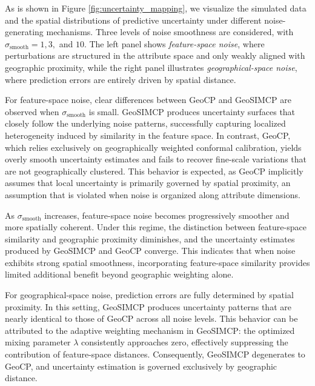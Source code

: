 \documentclass[authoryear,preprint,review,12pt]{elsarticle}
\begin{document}
{
\color{red}
As is shown in Figure \ref{fig:uncertainty_mapping}, we visualize the simulated data and the spatial distributions of predictive uncertainty under different noise-generating mechanisms. Three levels of noise smoothness are considered, with $\sigma_{\text{smooth}} = 1, 3,$ and $10$. The left panel shows \emph{feature-space noise}, where perturbations are structured in the attribute space and only weakly aligned with geographic proximity, while the right panel illustrates \emph{geographical-space noise}, where prediction errors are entirely driven by spatial distance.

For feature-space noise, clear differences between GeoCP and GeoSIMCP are observed when $\sigma_{\text{smooth}}$ is small. GeoSIMCP produces uncertainty surfaces that closely follow the underlying noise patterns, successfully capturing localized heterogeneity induced by similarity in the feature space. In contrast, GeoCP, which relies exclusively on geographically weighted conformal calibration, yields overly smooth uncertainty estimates and fails to recover fine-scale variations that are not geographically clustered. This behavior is expected, as GeoCP implicitly assumes that local uncertainty is primarily governed by spatial proximity, an assumption that is violated when noise is organized along attribute dimensions.

As $\sigma_{\text{smooth}}$ increases, feature-space noise becomes progressively smoother and more spatially coherent. Under this regime, the distinction between feature-space similarity and geographic proximity diminishes, and the uncertainty estimates produced by GeoSIMCP and GeoCP converge. This indicates that when noise exhibits strong spatial smoothness, incorporating feature-space similarity provides limited additional benefit beyond geographic weighting alone.

For geographical-space noise, prediction errors are fully determined by spatial proximity. In this setting, GeoSIMCP produces uncertainty patterns that are nearly identical to those of GeoCP across all noise levels. This behavior can be attributed to the adaptive weighting mechanism in GeoSIMCP: the optimized mixing parameter $\lambda$ consistently approaches zero, effectively suppressing the contribution of feature-space distances. Consequently, GeoSIMCP degenerates to GeoCP, and uncertainty estimation is governed exclusively by geographic distance.

}
\end{document}
